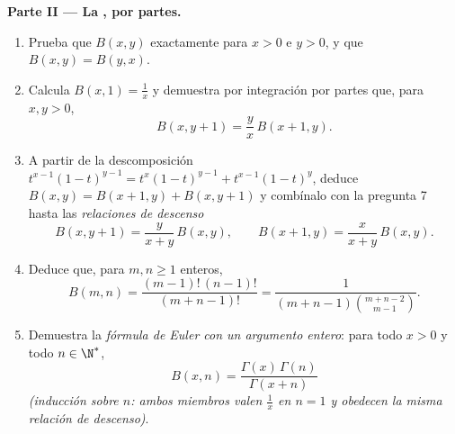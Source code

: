 \begin{problem}
\medskip
\noindent\textbf{Parte II --- La , por partes.}
\begin{enumerate}[resume]
  \item Prueba que $B(x,y)$  exactamente para $x > 0$ e $y >
        0$, y que $B(x,y) = B(y,x)$.
  \item Calcula $B(x, 1) = \frac1x$ y demuestra por integración por
        partes que, para $x, y > 0$,
        \[
        B(x, y+1) = \frac{y}{x}\,B(x+1, y) .
        \]
  \item A partir de la descomposición $t^{x-1}(1-t)^{y-1} =
        t^{x}(1-t)^{y-1} + t^{x-1}(1-t)^{y}$, deduce $B(x,y) =
        B(x+1,y) + B(x,y+1)$ y combínalo con la pregunta 7 hasta las
        \emph{relaciones de descenso}
        \[
        B(x, y+1) = \frac{y}{x+y}\,B(x,y),
        \qquad
        B(x+1, y) = \frac{x}{x+y}\,B(x,y) .
        \]
  \item Deduce que, para $m, n \geq 1$ enteros,
        \[
        B(m, n) = \frac{(m-1)!\,(n-1)!}{(m+n-1)!}
        = \frac{1}{(m+n-1)\binom{m+n-2}{m-1}} .
        \]
  \item Demuestra la \emph{fórmula de Euler con un argumento
        entero}: para todo $x > 0$ y todo $n \in \N^*$,
        \[
        B(x, n) = \frac{\Gamma(x)\,\Gamma(n)}{\Gamma(x + n)}
        \]
        \emph{(inducción sobre $n$: ambos miembros valen $\frac1x$
        en $n = 1$ y obedecen la misma relación de descenso)}.
\end{enumerate}


\end{problem}
